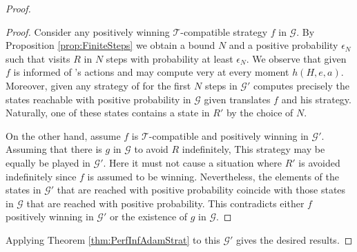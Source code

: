 \begin{proof}
\begin{proof}
    Consider any positively winning $\mathcal{T}$-compatible strategy $f$ in
    $\mathcal{G}$. By Proposition \ref{prop:FiniteSteps} we obtain a bound 
    $N$ and a positive probability $\epsilon_{N}$ such that \eve{} visits $R$
    in $N$ steps with probability at least $\epsilon_{N}$. We observe that
    given $f$ \adam{} is informed of \eve{}'s actions and may compute very at
    every moment $h(H, e, a)$. Moreover, given any strategy of \adam{} for the
    first $N$ steps in $\mathcal{G'}$ computes precisely the states reachable
    with positive probability in $\mathcal{G}$ given \eve{} translates $f$ and 
    \adam{} his strategy. Naturally, one of these states contains a state in
    $R'$ by the choice of $N$.

    On the other hand, assume $f$ is $\mathcal{T}$-compatible and positively
    winning in $\mathcal{G'}$. Assuming that there is $g$ in $\mathcal{G}$ to
    avoid $R$ indefinitely, This strategy may be equally be played in 
    $\mathcal{G'}$. Here it must not cause a situation where $R'$ is avoided
    indefinitely since $f$ is assumed to be winning. Nevertheless, the elements 
    of the states in $\mathcal{G'}$ that are reached with positive probability 
    coincide with those states in $\mathcal{G}$ that are reached with positive 
    probability. This contradicts either $f$ positively winning in 
    $\mathcal{G'}$ or the existence of $g$ in $\mathcal{G}$.
  \end{proof}
  Applying Theorem \ref{thm:PerfInfAdamStrat} to this $\mathcal{G'}$ gives the
  desired results.
\end{proof}


